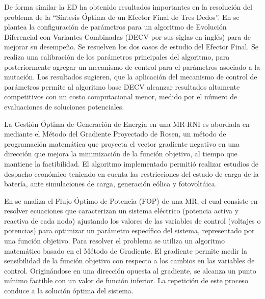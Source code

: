   De forma similar la ED ha obtenido resultados importantes en la resolución del problema de la ``Síntesis Óptima de un Efector Final de Tres Dedos''. En \cite{mezura-montes_dynamic_2015} se plantea la configuración de parámetros para un algoritmo de Evolución Diferencial con Variantes Combinadas (DECV por sus siglas en inglés) para de mejorar su desempeño. Se resuelven los dos casos de estudio del Efector Final. Se realiza una calibración de los parámetros principales del algoritmo, para posteriormente agregar un mecanismo de control para el parámetros asociado a la mutación. Los resultados sugieren, que la aplicación del mecanismo de control de parámetros permite al algoritmo base DECV alcanzar resultados altamente competitivos con un costo computacional menor, medido por el número de evaluaciones de soluciones potenciales.
  
  

 La Gestión Óptima de Generación de Energía en una MR-RNI es abordada en \cite{chica_leal_optimizacion_2015} mediante el Método del Gradiente Proyectado de Rosen, un método de programación matemática que proyecta el vector gradiente negativo  en una dirección que mejora la  minimización de la función objetivo, al tiempo que mantiene la factibilidad. El algoritmo implementado permitió realizar estudios de despacho económico teniendo en cuenta las restricciones del estado de carga de la batería, ante simulaciones de carga, generación eólica y fotovoltáica. 
 
 En \cite{heredia-ramirez_optimal_2014} se analiza el Flujo Óptimo de Potencia (FOP) de una MR, el cual consiste en resolver ecuaciones que caracterizan un sistema eléctrico (potencia activa y reactiva de cada nodo) ajustando los valores de las variables de control (voltajes o potencias) para optimizar un parámetro específico del sistema, representado por una función objetivo. Para resolver el problema se utiliza un algoritmo matemático basado en el Método de Gradiente. El gradiente permite medir la sensibilidad de la función objetivo con respecto a los cambios en las variables de control. Originándose en una dirección opuesta al gradiente, se alcanza un punto mínimo factible con un valor de función inferior. La repetición de este proceso conduce a la solución óptima del sistema.
 
